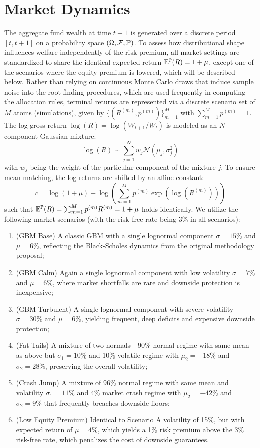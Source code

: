 \section{Market Dynamics}
The aggregate fund wealth at time $t+1$ is generated over a discrete period $[t,t+1]$ on a probability space $(\Omega, \mathcal{F}, \P)$. To assess how distributional shape influences welfare independently of the risk premium, all market settings are standardized to share the identical expected return $\E^\P(R) = 1+\mu$, except one of the scenarios where the equity premium is lowered, which will be described below. Rather than relying on continuous Monte Carlo draws that induce sample noise into the root-finding procedures, which are used frequently in computing the allocation rules, terminal returns are represented via a discrete scenario set of $M$ atoms (simulations), given by $\{(R^{(m)}, p^{(m)})\}_{m=1}^M$ with $\sum_{m=1}^M p^{(m)} = 1$. The log gross return $\log(R) = \log(W_{t+1}/W_t)$ is modeled as an $N$-component Gaussian mixture:
\begin{equation*}
    \log(R) \sim \sum_{j=1}^N w_j \mathcal{N}(\mu_j, \sigma^2_j)
\end{equation*}
with $w_j$ being the weight of the particular component of the mixture $j$. To ensure mean matching, the log returns are shifted by an affine constant:
\begin{equation*}
    c = \log(1 + \mu) - \log\left(\sum_{m=1}^M p^{(m)} \exp(\log(R^{(m)}))\right)
\end{equation*}
such that $\E^\P(R) = \sum_{m=1}^M p^{(m)} R^{(m)} = 1 + \mu$ holds identically. We utilize the following market scenarios (with the risk-free rate being 3\% in all scenarios):
\begin{enumerate}
    \item[A:] (GBM Base) A classic GBM with a single lognormal component $\sigma = 15\%$ and $\mu = 6\%$, reflecting the Black-Scholes dynamics from the original methodology proposal;
    \item[B:] (GBM Calm) Again a single lognormal component with low volatility $\sigma = 7\%$ and $\mu = 6\%$, where market shortfalls are rare and downside protection is inexpensive;
    \item[C:] (GBM Turbulent) A single lognormal component with severe volatility $\sigma = 30\%$ and $\mu = 6\%$, yielding frequent, deep deficits and expensive downside protection;
    \item[D:] (Fat Tails) A mixture of two normals - 90\% normal regime with same mean as above but $\sigma_1 = 10\%$ and 10\% volatile regime with $\mu_2 = -18\%$ and $\sigma_2 = 28\%$, preserving the overall volatility;
    \item[E:] (Crash Jump) A mixture of 96\% normal regime with same mean and volatility $\sigma_1 = 11\%$ and 4\% market crash regime with $\mu_2 = -42\%$ and $\sigma_2 = 9\%$ that frequently breaches downside floors;
    \item[F:] (Low Equity Premium) Identical to Scenario A volatility of 15\%, but with expected return of $\mu = 4\%$, which yields a 1\% risk premium above the 3\% risk-free rate, which penalizes the cost of downside guarantees.
\end{enumerate}
